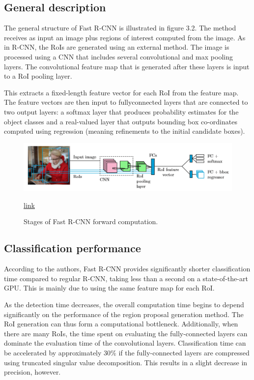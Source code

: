 \subsection{General description}

The general structure of Fast R-CNN is illustrated in figure 3.2. The method receives as input an image plus regions of interest computed from the image. As in R-CNN, the RoIs are generated using an external method. The image is processed using a CNN that includes several convolutional and max pooling layers. The convolutional feature map that is generated after these layers is input to a RoI pooling layer. 

This extracts a fixed-length feature vector for each RoI from the feature map. The feature vectors are then input to fullyconnected layers that are connected to two output layers: a softmax layer that produces probability estimates for the object classes and a real-valued layer that outputs bounding box co-ordinates computed using regression (meaning refinements to the initial candidate boxes).

\begin{figure}
	\centering
	\includegraphics[width=0.9\linewidth]{img6}
	\caption{Stages of Fast R-CNN forward computation.} \href{https://www.semanticscholar.org/paper/Object-detection-from-images-using-convolutional-Stenroos/a6ee78ea9c68d99d6545227fed925a721337bb16/figure/5}{link}
	\label{fig:img6}
\end{figure}

\subsection{Classification performance}
According to the authors, Fast R-CNN provides significantly shorter classification time compared to regular R-CNN, taking less than a second on a state-of-the-art GPU. This is mainly due to using the same feature map for each RoI.

As the detection time decreases, the overall computation time begins to depend significantly on the performance of the region proposal generation method. The RoI generation can thus form a computational bottleneck. Additionally, when there are many RoIs, the time spent on evaluating the fully-connected layers can dominate the evaluation time of the convolutional layers. Classification time can be accelerated by approximately 30\% if the fully-connected layers are compressed using truncated singular value decomposition. This results in a slight decrease in precision, however.

